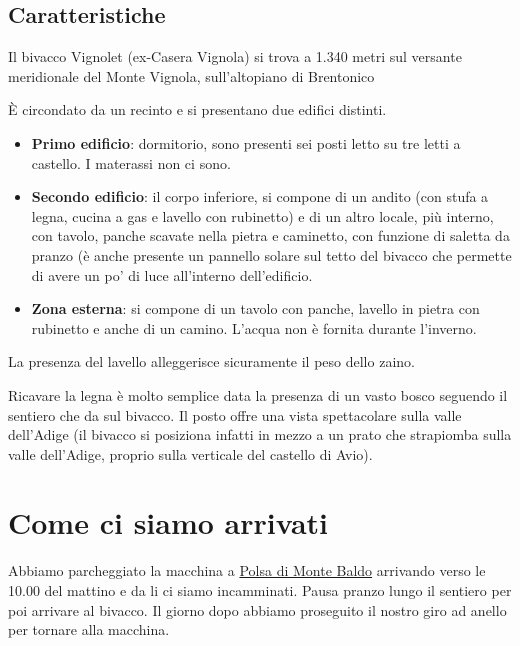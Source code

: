 \documentclass{article}
\begin{document}
\subsection{Caratteristiche}
Il bivacco Vignolet (ex-Casera Vignola) si trova a 1.340 metri sul versante meridionale del Monte Vignola, sull'altopiano di Brentonico

È circondato da un recinto e si presentano due edifici distinti.
\begin{itemize}
    \item \textbf{Primo edificio}: dormitorio, sono presenti sei posti letto su tre letti a castello. I materassi non ci sono.
    \item \textbf{Secondo edificio}: il corpo inferiore, si compone di un andito (con stufa a legna, cucina a gas e lavello con rubinetto) e di un altro locale, più interno, con tavolo, panche scavate nella pietra e caminetto, con funzione di saletta da pranzo (è anche presente un pannello solare sul tetto del bivacco che permette di avere un po' di luce all'interno dell'edificio.
    \item \textbf{Zona esterna}: si compone di un tavolo con panche, lavello in pietra con rubinetto e anche di un camino. L'acqua non è fornita durante l'inverno.
\end{itemize}

La presenza del lavello alleggerisce sicuramente il peso dello zaino.

Ricavare la legna è molto semplice data la presenza di un vasto bosco seguendo il sentiero che da sul bivacco. Il posto offre una vista spettacolare sulla valle dell'Adige (il bivacco si posiziona infatti in mezzo a un prato che strapiomba sulla valle dell'Adige, proprio sulla verticale del castello di Avio).

\section{Come ci siamo arrivati}
Abbiamo parcheggiato la macchina a \href{https://maps.google.com/?q=45.784113191812516,10.94203653416266}{Polsa di Monte Baldo} arrivando verso le 10.00 del mattino e da li ci siamo incamminati. Pausa pranzo lungo il sentiero per poi arrivare al bivacco. Il giorno dopo abbiamo proseguito il nostro giro ad anello per tornare alla macchina.
\end{document}
